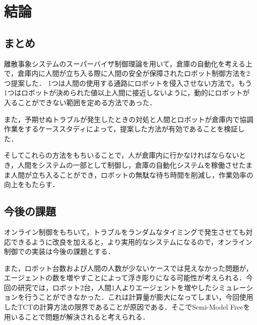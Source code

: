 \chapter{結論}

\section{まとめ}

離散事象システムのスーパーバイザ制御理論を用いて，倉庫の自動化を考える上で，倉庫内に人間が立ち入る際に人間の安全が保障されたロボット制御方法を2つ提案した．
1つは人間の使用する通路にロボットを侵入させない方法で，もう1つはロボットが決められた値以上人間に接近しないように，動的にロボットが入ることができない範囲を定める方法であった．

また，予期せぬトラブルが発生したときの対処と人間とロボットが倉庫内で協調作業をするケーススタディによって，提案した方法が有効であることを検証した．

そしてこれらの方法をもちいることで，人が倉庫内に行かなければならないとき，人間をシステムの一部として制御し，倉庫の自動化システムを稼働させたまま人間が立ち入ることができ，ロボットの無駄な待ち時間を削減し，作業効率の向上をもたらす．


\section{今後の課題}

オンライン制御をもちいて，トラブルをランダムなタイミングで発生させても対応できるように改良を加えると，より実用的なシステムになるので，オンライン制御での実装は今後の課題とする．

また，ロボット台数および人間の人数が少ないケースでは見えなかった問題が，エージェントの数を増やすことによって浮き彫りになる可能性が考えられる．今回の研究では，ロボット2台，人間1人よりエージェントを増やしたシミュレーションを行うことができなかった．これは計算量が膨大になってしまい，今回使用したTCTの計算方法の限界であることが原因である．そこでSemi-Model Free\cite{Semi-Model_Free}を用いることで問題が解決されると考えられる．